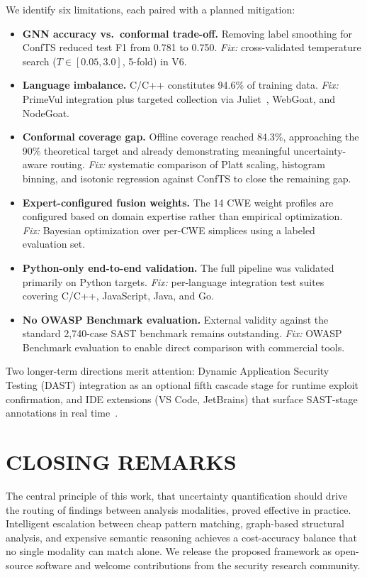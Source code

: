 We identify six limitations, each paired with a planned mitigation:

\begin{itemize}
    \item \textbf{GNN accuracy vs.\ conformal trade-off.} Removing label smoothing for ConfTS reduced test F1 from 0.781 to 0.750. \textit{Fix:} cross-validated temperature search ($T \in [0.05, 3.0]$, 5-fold) in V6.
    \item \textbf{Language imbalance.} C/C++ constitutes 94.6\% of training data. \textit{Fix:} PrimeVul integration plus targeted collection via Juliet~\cite{juliet2017}, WebGoat, and NodeGoat.
    \item \textbf{Conformal coverage gap.} Offline coverage reached 84.3\%, approaching the 90\% theoretical target and already demonstrating meaningful uncertainty-aware routing. \textit{Fix:} systematic comparison of Platt scaling, histogram binning, and isotonic regression against ConfTS to close the remaining gap.
    \item \textbf{Expert-configured fusion weights.} The 14 CWE weight profiles are configured based on domain expertise rather than empirical optimization. \textit{Fix:} Bayesian optimization over per-CWE simplices using a labeled evaluation set.
    \item \textbf{Python-only end-to-end validation.} The full pipeline was validated primarily on Python targets. \textit{Fix:} per-language integration test suites covering C/C++, JavaScript, Java, and Go.
    \item \textbf{No OWASP Benchmark evaluation.} External validity against the standard 2,740-case SAST benchmark remains outstanding. \textit{Fix:} OWASP Benchmark evaluation to enable direct comparison with commercial tools.
\end{itemize}

Two longer-term directions merit attention: Dynamic Application Security Testing (DAST) integration as an optional fifth cascade stage for runtime exploit confirmation, and IDE extensions (VS Code, JetBrains) that surface SAST-stage annotations in real time~\cite{johnson2013}.

\section{\uppercase{Closing Remarks}}

The central principle of this work, that uncertainty quantification should
drive the routing of findings between analysis modalities, proved effective in
practice. Intelligent escalation between cheap pattern matching, graph-based
structural analysis, and expensive semantic reasoning achieves a cost-accuracy
balance that no single modality can match alone. We release the proposed
framework as open-source software and welcome contributions from the security
research community.
